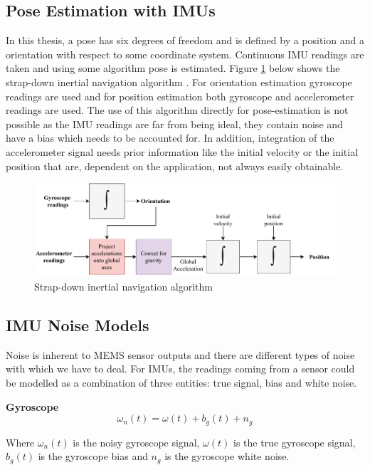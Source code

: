 \subsection{Pose Estimation with IMUs}
In this thesis, a pose has six degrees of freedom and is defined by a position and a orientation with respect to some coordinate system. Continuous IMU readings are taken and using some algorithm pose is estimated. Figure \ref{fig:strapdown_imu} below shows the strap-down inertial navigation algorithm \citep{woodman2007introduction}. For orientation estimation gyroscope readings are used and for position estimation both gyroscope and accelerometer readings are used. The use of this algorithm directly for pose-estimation is not possible as the IMU readings are far from being ideal, they contain noise and have a bias \citep{woodman2007introduction} which needs to be accounted for. In addition, integration of the accelerometer signal needs prior information like the initial velocity or the initial position that are, dependent on the application, not always easily obtainable.

\begin{figure}[H]
\includegraphics[scale=0.72]{images/fig_chapter2/strap_imu_algo.pdf}
\caption{Strap-down inertial navigation algorithm }
\label{fig:strapdown_imu}
\end{figure}

\subsection{IMU Noise Models}
Noise is inherent to MEMS sensor outputs and there are different types of noise with which we have to deal. For IMUs, the readings coming from a sensor could be modelled as a combination of three entities: true signal, bias and white noise.

\textbf{Gyroscope}
\begin{equation}
    \omega_{n}(t) = \omega(t) + b_{g}(t) + n_{g}
\label{eqn:gyro_noise}
\end{equation}

Where $ \omega_{n}(t) $ is the noisy gyroscope signal, $ \omega(t) $ is the true gyroscope signal, $ b_{g}(t) $ is the gyroscope bias and $ n_{g} $ is the gyroscope white noise.

